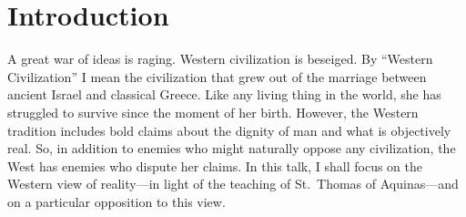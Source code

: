 \documentclass[twocolumn]{article}
\begin{document}
\thispagestyle{fancy}

\section{Introduction}

A great war of ideas is raging.  Western civilization is beseiged.  By
``Western Civilization'' I mean the civilization that grew out of the marriage
between ancient Israel and classical Greece.  Like any living thing in the
world, she has struggled to survive since the moment of her birth.  However,
the Western tradition includes bold claims about the dignity of man and what is
objectively real.  So, in addition to enemies who might naturally oppose any
civilization, the West has enemies who dispute her claims.  In this talk, I
shall focus on the Western view of reality---in light of the teaching of
St.~Thomas of Aquinas---and on a particular opposition to this view.
\end{document}
